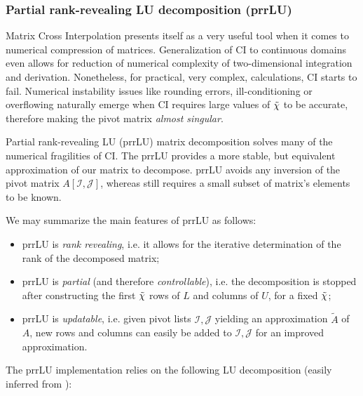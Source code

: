 \subsubsection{Partial rank-revealing LU decomposition (prrLU)}
Matrix Cross Interpolation presents itself as a very useful tool when it comes to numerical compression of matrices. Generalization of CI to continuous domains \cite{Schneider2010, Fernandez2022} even allows for reduction of numerical complexity of two-dimensional integration and derivation. Nonetheless, for practical, very complex, calculations, CI starts to fail. Numerical instability issues like rounding errors, ill-conditioning or overflowing \cite{Golub96} naturally emerge when CI requires large values of ${\tilde \chi}$ to be accurate, therefore making the pivot matrix \textit{almost singular}. 

Partial rank-revealing LU (prrLU) \cite{Golub96, Pan2000} matrix decomposition solves many of the numerical fragilities of CI. The prrLU provides a more stable, but equivalent approximation of our matrix to decompose. prrLU avoids any inversion of the pivot matrix $A[\mathcal{I}, \mathcal{J}]$, whereas still requires a small subset of matrix's elements to be known. 

We may summarize the main features of prrLU as follows:

\begin{itemize}
	\item prrLU is \textit{rank revealing}, i.e. it allows for the iterative determination of the rank of the decomposed matrix;
	\item prrLU is \textit{partial} (and therefore \textit{controllable}), i.e. the decomposition is stopped after constructing the first ${\tilde \chi}$ rows of $L$ and columns of $U$, for a fixed ${\tilde \chi}$;
	\item prrLU is \textit{updatable}, i.e. given pivot lists $\mathcal{I}, \mathcal{J}$ yielding an approximation $\tilde{A}$ of $A$, new rows and columns can easily be added to $\mathcal{I}, \mathcal{J}$ for an improved approximation. 
\end{itemize}

The prrLU implementation relies on the following LU decomposition (easily inferred from ):

